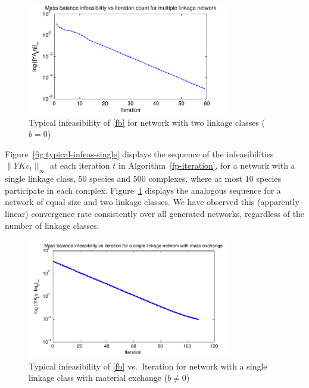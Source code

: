 \documentclass[smallextended]{svjour3}       %
\newcommand*{\0}{\mathbf{0}}
\newcommand*{\1}{\mathbf{1}}
\begin{document}
\begin{figure}%
   \centering
   \includegraphics[width=0.78\textwidth]{InfeasibilityVsIterationMultiple}
   \caption{Typical infeasibility of \eqref{fb} for network with
            two linkage classes ($b=0$)}
   \label{fig:typical-infeas-multiple}
\end{figure}

Figure~\ref{fig:typical-infeas-single} displays the sequence of the
infeasibilities $\|YKv_t\|_\infty$ at each iteration $t$ in
Algorithm~\ref{fp-iteration}, for a network with a single
linkage class, $50$ species and $500$ complexes, where at
most $10$ species participate in each
complex. Figure~\ref{fig:typical-infeas-multiple} displays the
analogous sequence for a network of equal size and two
linkage classes.  We have observed this (apparently linear)
convergence rate consistently over all generated networks, regardless
of the number of linkage classes.

\begin{figure}%
   \centering 
   \includegraphics[width=0.8\textwidth]{InfeasibilityVsIterationOpen}
   \caption{Typical infeasibility of \eqref{fb} vs.\ Iteration for network with a
            single linkage class with material exchange ($b\neq0$)} 
   \label{fig:typical-infeas-single-open} 
\end{figure}
\end{document}
